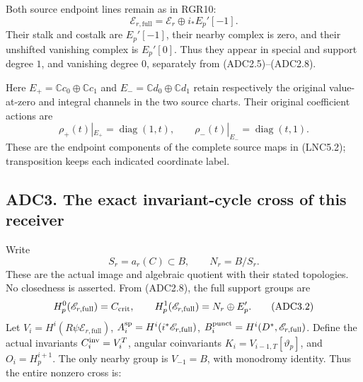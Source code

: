 Both source endpoint lines remain as in RGR10: \[
\mathscr E_{r,\mathrm{full}}=\mathscr E_r\oplus i_*E_p'[-1].
\tag{ADC2.9}
\] Their stalk and costalk are \(E_p'[-1]\), their nearby complex is
zero, and their unshifted vanishing complex is \(E_p'[0]\). Thus they
appear in special and support degree \(1\), and vanishing degree \(0\),
separately from (ADC2.5)--(ADC2.8).

Here \(E_+=\mathbb C c_0\oplus\mathbb C c_1\) and
\(E_-=\mathbb C d_0\oplus\mathbb C d_1\) retain respectively the
original value-at-zero and integral channels in the two source charts.
Their original coefficient actions are \[
\rho_+(t)|_{E_+}=\operatorname{diag}(1,t),\qquad
\rho_-(t)|_{E_-}=\operatorname{diag}(t,1).
\tag{ADC2.10}
\] These are the endpoint components of the complete source maps in
(LNC5.2); transposition keeps each indicated coordinate label.

\subsection{ADC3. The exact invariant-cycle cross of this
receiver}\label{adc3.-the-exact-invariant-cycle-cross-of-this-receiver}

Write \[
S_r=a_r(C)\subset B,\qquad N_r=B/S_r.
\tag{ADC3.1}
\] These are the actual image and algebraic quotient with their stated
topologies. No closedness is asserted. From (ADC2.8), the full support
groups are \[
H^0_p(\mathscr E_{r,\mathrm{full}})=C_{\rm crit},\qquad
H^1_p(\mathscr E_{r,\mathrm{full}})=N_r\oplus E_p'.
\tag{ADC3.2}
\] Let \(V_i=H^i(R\psi\mathscr E_{r,\mathrm{full}})\),
\(A_i^{\rm sp}=H^i(i^*\mathscr E_{r,\mathrm{full}})\),
\(B_i^{\rm punct}=H^i(D^*,\mathscr E_{r,\mathrm{full}})\). Define the
actual invariants \(C_i^{\rm inv}=V_i^T\), angular coinvariants
\(K_i=V_{i-1,T}[\vartheta_p]\), and \(O_i=H^{i+1}_p\). The only nearby
group is \(V_{-1}=B\), with monodromy identity. Thus the entire nonzero
cross is:

